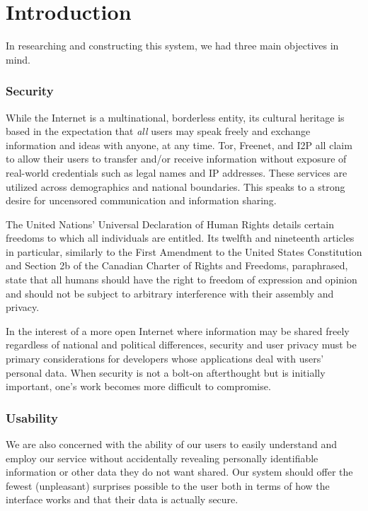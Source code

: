 \section{Introduction}
\label{sec:intro}

In researching and constructing this system, we had three main
objectives in mind.

\subsubsection*{Security}

While the Internet is a multinational, borderless entity, its
cultural heritage is based in the expectation that \textit{all}
users may speak freely and exchange information and ideas with
anyone, at any time. Tor, Freenet, and I2P all claim to
allow their users to transfer and/or receive information without
exposure of real-world credentials such as legal names and
IP addresses. These services are utilized across demographics
and national boundaries. This speaks to a strong desire for
uncensored communication and information sharing.

The United Nations' Universal Declaration of Human Rights details
certain freedoms to which all individuals are entitled. Its
twelfth and nineteenth articles in particular, similarly to the
First Amendment to the United States Constitution and Section 2b
of the Canadian Charter of Rights and Freedoms, paraphrased,
state that all humans should have the
right to freedom of expression and
opinion and should not be subject to arbitrary interference with
their assembly and privacy.

In the interest of a more open Internet where information may be
shared freely regardless of national and political differences,
security and user privacy must be primary considerations for
developers whose applications deal with users' personal data.
When security is not a bolt-on afterthought but is initially
important, one's work becomes more difficult to compromise.

\subsubsection*{Usability}

We are also concerned with the ability of our users to easily
understand and employ our service without accidentally revealing
personally identifiable information or other data they do not
want shared. Our system should offer the fewest (unpleasant)
surprises possible to the user both in terms of how the interface
works and that their data is actually secure.

